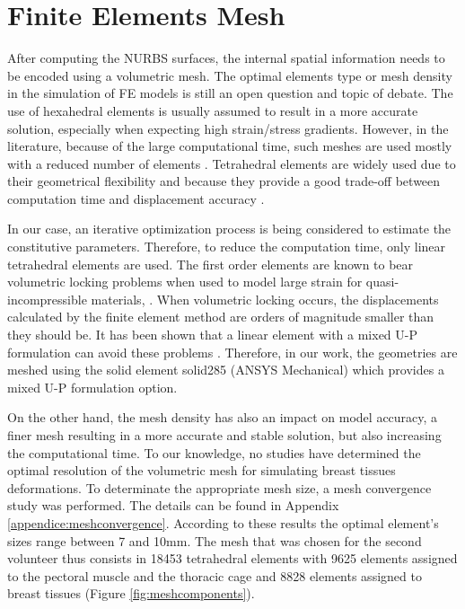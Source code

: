 \section{ Finite Elements Mesh}\label{section:myFEM}

After computing the NURBS surfaces, the internal spatial information needs to be encoded using a volumetric mesh. The optimal elements type or mesh density in the simulation of FE models is still an open question and topic of debate. The use of hexahedral elements is usually assumed to result in a more accurate solution, especially when expecting high strain/stress gradients. However, in the literature, because of the large computational time, such meshes are used mostly with a reduced number of elements \citep{ruiter_model_based_2006,gamage_modelling_2012}. Tetrahedral elements are widely used due to their geometrical flexibility and because they provide a good trade-off between computation time and displacement accuracy \citep{han_nonlinear_2014,palomar_finite_2008,griesenauer_breast_2017}.   

In our case, an iterative optimization process is being considered to estimate the constitutive parameters. Therefore, to reduce the computation time, only linear tetrahedral elements are used. The first order elements are known to bear volumetric locking problems when used to model large strain for quasi-incompressible materials, \citep{fung_classical_2017}. When volumetric locking occurs, the displacements calculated by the finite element method are orders of magnitude smaller than they should be. It has been shown that a linear element with a mixed U-P formulation can avoid these problems \citep{rohan_finite_2014}. Therefore, in our work, the geometries are meshed using the solid element solid285 (ANSYS Mechanical) which provides a mixed U-P formulation option. 

 On the other hand, the mesh density has also an impact on model accuracy, a finer mesh resulting in a more accurate and stable solution, but also increasing the computational time. To our knowledge, no studies have determined the optimal resolution of the volumetric mesh for simulating breast tissues deformations. To determinate the appropriate mesh size, a mesh convergence study was performed. The details can be found in Appendix \ref{appendice:meshconvergence}.  According to these results the optimal element’s sizes range between 7 and 10mm. The mesh that was chosen for the second volunteer thus consists in 18453 tetrahedral elements with 9625 elements assigned to the pectoral muscle and the thoracic cage and 8828 elements assigned to breast tissues (Figure \ref{fig:meshcomponents}).
 
